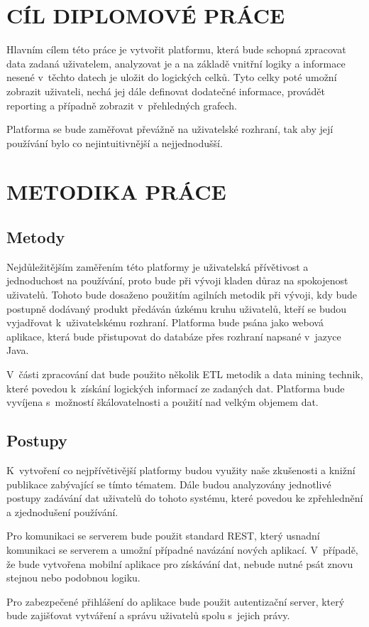 \chapter*{CÍL DIPLOMOVÉ PRÁCE}
Hlavním cílem této práce je vytvořit platformu, která bude schopná zpracovat data zadaná uživatelem, analyzovat je a na základě vnitřní logiky a informace nesené v~těchto datech je uložit do logických celků. Tyto celky poté umožní zobrazit uživateli, nechá jej dále definovat dodatečné informace, provádět reporting a případně zobrazit v~přehledných grafech.

Platforma se bude zaměřovat převážně na uživatelské rozhraní, tak aby její používání bylo co nejintuitivnější a nejjednodušší.

\chapter*{METODIKA PRÁCE}
\section*{Metody}
\par Nejdůležitějším zaměřením této platformy je uživatelská přívětivost a jednoduchost na používání, proto bude při vývoji kladen důraz na spokojenost uživatelů. Tohoto bude dosaženo použitím agilních metodik při vývoji, kdy bude postupně dodávaný produkt předáván úzkému kruhu uživatelů, kteří se budou vyjadřovat k~uživatelskému rozhraní. Platforma bude psána jako webová aplikace, která bude přistupovat do databáze přes rozhraní napsané v~jazyce Java.
\par V~části zpracování dat bude použito několik ETL metodik a data mining technik, které povedou k~získání logických informací ze zadaných dat. Platforma bude vyvíjena s~možností 
škálovatelnosti a použití nad velkým objemem dat.

\section*{Postupy}
\par K~vytvoření co nejpřívětivější platformy budou využity naše zkušenosti a knižní publikace zabývající se tímto tématem. Dále budou analyzovány jednotlivé postupy zadávání dat uživatelů do tohoto systému, které povedou ke zpřehlednění a zjednodušení používání.
\par Pro komunikaci se serverem bude použit standard REST, který usnadní komunikaci se serverem a umožní případné navázání nových aplikací. V~případě, že bude vytvořena mobilní aplikace pro získávání dat, nebude nutné psát znovu stejnou nebo podobnou logiku.
\par Pro zabezpečené přihlášení do aplikace bude použit autentizační server, který bude zajišťovat vytváření a správu uživatelů spolu s~jejich právy.

